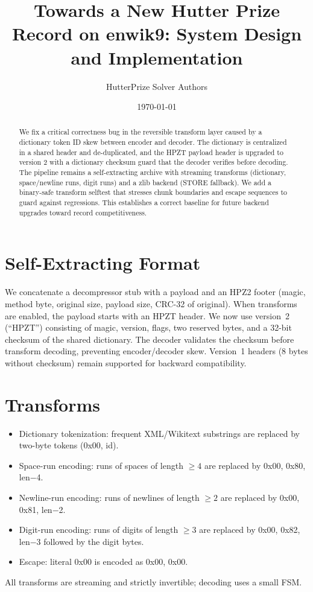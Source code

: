 \documentclass[11pt]{article}
\title{Towards a New Hutter Prize Record on enwik9: System Design and Implementation}
\author{HutterPrize Solver Authors}
\date{\today}
\begin{document}
\maketitle
\begin{abstract}
We fix a critical correctness bug in the reversible transform layer caused by a dictionary token ID skew between encoder and decoder. The dictionary is centralized in a shared header and de-duplicated, and the HPZT payload header is upgraded to version 2 with a dictionary checksum guard that the decoder verifies before decoding. The pipeline remains a self-extracting archive with streaming transforms (dictionary, space/newline runs, digit runs) and a zlib backend (STORE fallback). We add a binary-safe transform selftest that stresses chunk boundaries and escape sequences to guard against regressions. This establishes a correct baseline for future backend upgrades toward record competitiveness.
\end{abstract}

\section{Self-Extracting Format}
We concatenate a decompressor stub with a payload and an HPZ2 footer (magic, method byte, original size, payload size, CRC-32 of original). When transforms are enabled, the payload starts with an HPZT header. We now use version~2 (``HPZT'') consisting of magic, version, flags, two reserved bytes, and a 32-bit checksum of the shared dictionary. The decoder validates the checksum before transform decoding, preventing encoder/decoder skew. Version~1 headers (8 bytes without checksum) remain supported for backward compatibility.

\section{Transforms}
\begin{itemize}[noitemsep]
  \item Dictionary tokenization: frequent XML/Wikitext substrings are replaced by two-byte tokens (0x00, id).
  \item Space-run encoding: runs of spaces of length $\ge 4$ are replaced by 0x00, 0x80, len$-$4.
  \item Newline-run encoding: runs of newlines of length $\ge 2$ are replaced by 0x00, 0x81, len$-$2.
  \item Digit-run encoding: runs of digits of length $\ge 3$ are replaced by 0x00, 0x82, len$-$3 followed by the digit bytes.
  \item Escape: literal 0x00 is encoded as 0x00, 0x00.
\end{itemize}
All transforms are streaming and strictly invertible; decoding uses a small FSM.
\end{document}
